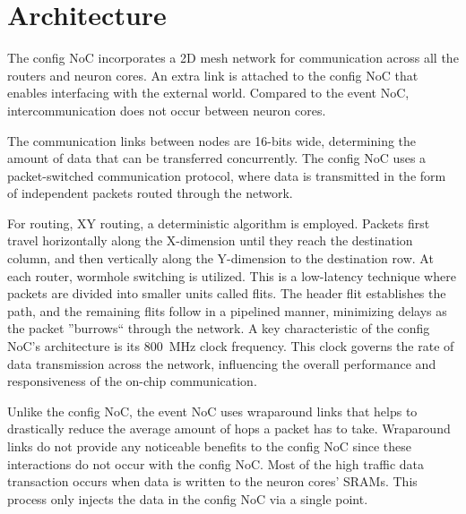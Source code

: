\section{Architecture}
The config NoC incorporates a 2D mesh network for communication across all the routers and neuron cores.
An extra link is attached to the config NoC that enables interfacing with the external world.
Compared to the event NoC, intercommunication does not occur between neuron cores.


The communication links between nodes are 16-bits wide, determining the amount of data that can be transferred concurrently.
The config NoC uses a packet-switched communication protocol, where data is transmitted in the form of independent packets routed through the network.

For routing, XY routing, a deterministic algorithm is employed.
Packets first travel horizontally along the X-dimension until they reach the destination column, and then vertically along the Y-dimension to the destination row.
At each router, wormhole switching is utilized.
This is a low-latency technique where packets are divided into smaller units called flits.
The header flit establishes the path, and the remaining flits follow in a pipelined manner, minimizing delays as the packet ''burrows`` through the network.
A key characteristic of the config NoC's architecture is its \SI{800}{MHz} clock frequency.
This clock governs the rate of data transmission across the network, influencing the overall performance and responsiveness of the on-chip communication.

Unlike the config NoC, the event NoC uses wraparound links that helps to drastically reduce the average amount of hops a packet has to take.
Wraparound links do not provide any noticeable benefits to the config NoC since these interactions do not occur with the config NoC.
Most of the high traffic data transaction occurs when data is written to the neuron cores' SRAMs.
This process only injects the data in the config NoC via a single point.


